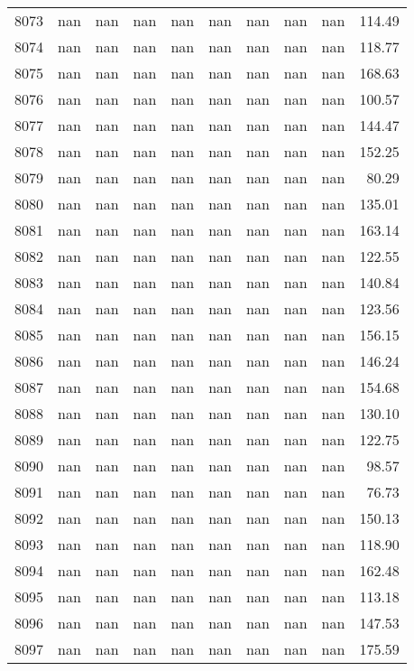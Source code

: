 \begin{tabular}{lrrrrrrrrr}
8073 & nan & nan & nan & nan & nan & nan & nan & nan & 114.49 \\
8074 & nan & nan & nan & nan & nan & nan & nan & nan & 118.77 \\
8075 & nan & nan & nan & nan & nan & nan & nan & nan & 168.63 \\
8076 & nan & nan & nan & nan & nan & nan & nan & nan & 100.57 \\
8077 & nan & nan & nan & nan & nan & nan & nan & nan & 144.47 \\
8078 & nan & nan & nan & nan & nan & nan & nan & nan & 152.25 \\
8079 & nan & nan & nan & nan & nan & nan & nan & nan & 80.29 \\
8080 & nan & nan & nan & nan & nan & nan & nan & nan & 135.01 \\
8081 & nan & nan & nan & nan & nan & nan & nan & nan & 163.14 \\
8082 & nan & nan & nan & nan & nan & nan & nan & nan & 122.55 \\
8083 & nan & nan & nan & nan & nan & nan & nan & nan & 140.84 \\
8084 & nan & nan & nan & nan & nan & nan & nan & nan & 123.56 \\
8085 & nan & nan & nan & nan & nan & nan & nan & nan & 156.15 \\
8086 & nan & nan & nan & nan & nan & nan & nan & nan & 146.24 \\
8087 & nan & nan & nan & nan & nan & nan & nan & nan & 154.68 \\
8088 & nan & nan & nan & nan & nan & nan & nan & nan & 130.10 \\
8089 & nan & nan & nan & nan & nan & nan & nan & nan & 122.75 \\
8090 & nan & nan & nan & nan & nan & nan & nan & nan & 98.57 \\
8091 & nan & nan & nan & nan & nan & nan & nan & nan & 76.73 \\
8092 & nan & nan & nan & nan & nan & nan & nan & nan & 150.13 \\
8093 & nan & nan & nan & nan & nan & nan & nan & nan & 118.90 \\
8094 & nan & nan & nan & nan & nan & nan & nan & nan & 162.48 \\
8095 & nan & nan & nan & nan & nan & nan & nan & nan & 113.18 \\
8096 & nan & nan & nan & nan & nan & nan & nan & nan & 147.53 \\
8097 & nan & nan & nan & nan & nan & nan & nan & nan & 175.59 \\

\end{tabular}
